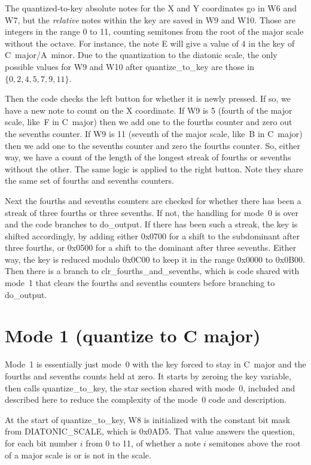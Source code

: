 The quantized-to-key absolute notes for the X and Y coordinates go
in W6 and W7, but the \emph{relative} notes within the key are saved in W9
and W10.  Those are integers in the range 0 to 11, counting semitones from
the root of the major scale without the octave.  For instance, the note E
will give a value of 4 in the key of C~major/A~minor.  Due to the
quantization to the diatonic scale, the only possible values for W9 and W10
after quantize\_to\_key are those in $\{0,2,4,5,7,9,11\}$.

Then the code checks the left button for whether it is newly pressed.  If
so, we have a new note to count on the X coordinate.  If W9 is 5 (fourth of
the major scale, like~F in C~major) then we add one to the fourths counter
and zero out the sevenths counter.  If W9 is 11 (seventh of the major scale,
like~B in C~major) then we add one to the sevenths counter and zero the
fourths counter.  So, either way, we have a count of the length of the
longest streak of fourths or sevenths without the other.  The same logic is
applied to the right button.  Note they share the same set of fourths and
sevenths counters.

Next the fourths and sevenths counters are checked for whether there has
been a streak of three fourths or three sevenths.  If not, the handling for
mode~0 is over and the code branches to do\_output.  If there has been such a
streak, the key is shifted accordingly, by adding either 0x0700 for a shift
to the subdominant after three fourths, or 0x0500 for a shift to the
dominant after three sevenths.  Either way, the key is reduced modulo 0x0C00
to keep it in the range 0x0000 to 0x0B00.  Then there is a branch to
clr\_fourths\_and\_sevenths, which is code shared with mode~1 that clears the
fourths and sevenths counters before branching to do\_output.

\section{Mode 1 (quantize to C major)}

Mode~1 is essentially just mode~0 with the key forced to stay in C~major and
the fourths and sevenths counts held at zero.  It starts by zeroing the key
variable, then calls quantize\_to\_key, the star section shared with mode~0,
included and described here to reduce the complexity of the mode~0 code and
description.

At the start of quantize\_to\_key, W8 is initialized with the constant bit
mask from DIATONIC\_SCALE, which is 0x0AD5.  That value answers the
question, for each bit number $i$ from 0 to 11, of whether a note $i$
semitones above the root of a major scale is or is not in the scale.

